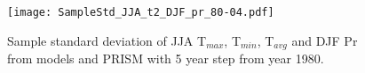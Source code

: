 \documentclass[ms]{agutexSI}
\begin{document}
\begin{article}



%

%
%
\end{article}
\clearpage


%
 
\begin{figure}
\begin{center}
\texttt{[image: SampleStd\_JJA\_t2\_DJF\_pr\_80-04.pdf]}
\caption{Sample standard deviation of JJA T$_{max}$, T$_{min}$, T$_{avg}$ and DJF Pr from models and PRISM with 5 year step from year 1980.}
\end{center}
\end{figure}
\end{document}
